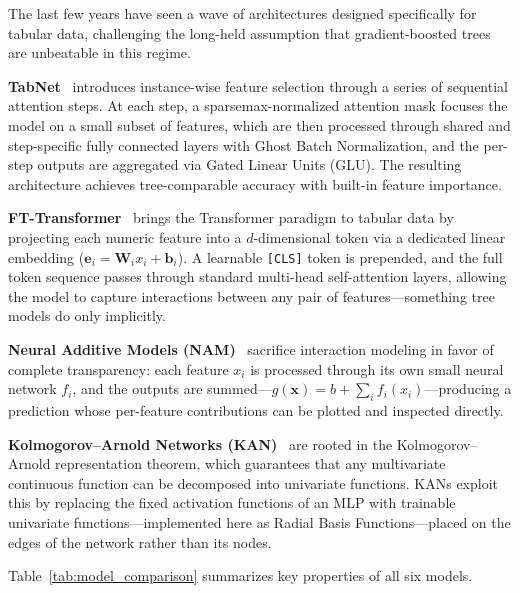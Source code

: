 \documentclass[journal, onecolumn]{IEEEtran}
\begin{document}
The last few years have seen a wave of architectures designed specifically for tabular data, challenging the long-held assumption that gradient-boosted trees are unbeatable in this regime.

\textbf{TabNet}~\cite{arik2021tabnet} introduces instance-wise feature selection through a series of sequential attention steps. At each step, a sparsemax-normalized attention mask focuses the model on a small subset of features, which are then processed through shared and step-specific fully connected layers with Ghost Batch Normalization, and the per-step outputs are aggregated via Gated Linear Units (GLU). The resulting architecture achieves tree-comparable accuracy with built-in feature importance.

\textbf{FT-Transformer}~\cite{gorishniy2021revisiting} brings the Transformer paradigm to tabular data by projecting each numeric feature into a $d$-dimensional token via a dedicated linear embedding ($\mathbf{e}_i = \mathbf{W}_i x_i + \mathbf{b}_i$). A learnable \texttt{[CLS]} token is prepended, and the full token sequence passes through standard multi-head self-attention layers, allowing the model to capture interactions between any pair of features---something tree models do only implicitly.

\textbf{Neural Additive Models (NAM)}~\cite{agarwal2021nam} sacrifice interaction modeling in favor of complete transparency: each feature $x_i$ is processed through its own small neural network $f_i$, and the outputs are summed---$g(\mathbf{x}) = b + \sum_i f_i(x_i)$---producing a prediction whose per-feature contributions can be plotted and inspected directly.

\textbf{Kolmogorov--Arnold Networks (KAN)}~\cite{liu2024kan} are rooted in the Kolmogorov--Arnold representation theorem, which guarantees that any multivariate continuous function can be decomposed into univariate functions. KANs exploit this by replacing the fixed activation functions of an MLP with trainable univariate functions---implemented here as Radial Basis Functions---placed on the edges of the network rather than its nodes.

Table~\ref{tab:model_comparison} summarizes key properties of all six models.
\end{document}
